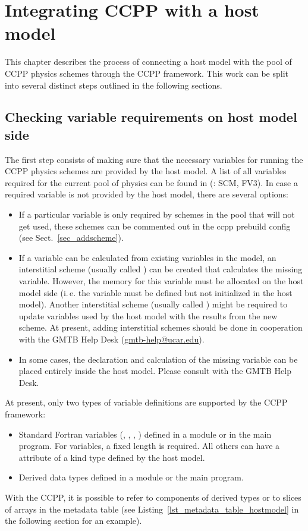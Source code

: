 \chapter{Integrating CCPP with a host model}
\label{chap_hostmodel}
\setlength{\parskip}{12pt}
This chapter describes the process of connecting a host model with the pool of CCPP physics schemes through the CCPP framework. This work can be split into several distinct steps outlined in the following sections.

\section{Checking variable requirements on host model side}
The first step consists of making sure that the necessary variables for running the CCPP physics schemes are provided by the host model. A list of all variables required for the current pool of physics can be found in  (: SCM, FV3). In case a required variable is not provided by the host model, there are several options:
\begin{itemize}
\item If a particular variable is only required by schemes in the pool that will not get used, these schemes can be commented out in the ccpp prebuild config (see Sect.~\ref{sec_addscheme}).
\item If a variable can be calculated from existing variables in the model, an interstitial scheme (usually called ) can be created that calculates the missing variable. However, the memory for this variable must be allocated on the host model side (i.\,e. the variable must be defined but not initialized in the host model). Another interstitial scheme (usually called ) might be required to update variables used by the host model with the results from the new scheme. At present, adding interstitial schemes should be done in cooperation with the GMTB Help Desk (\url{gmtb-help@ucar.edu}).
\item In some cases, the declaration and calculation of the missing variable can be placed entirely inside the host model. Please consult with the GMTB Help Desk.
\end{itemize}

At present, only two types of variable definitions are supported by the CCPP framework:
\begin{itemize}
\item Standard Fortran variables (, , , ) defined in a module or in the main program. For  variables, a fixed length is required. All others can have a  attribute of a kind type defined by the host model.
\item Derived data types defined in a module or the main program.
\end{itemize}
With the CCPP, it is possible to refer to components of derived types or to slices of arrays in the metadata table (see Listing~\ref{lst_metadata_table_hostmodel} in the following section for an example).

